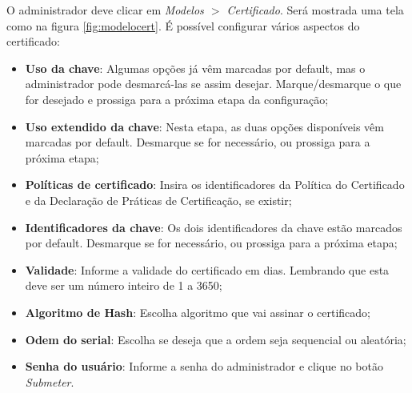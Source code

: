 O administrador deve clicar em \textit{Modelos $>$ Certificado}. Será mostrada uma tela como na figura \ref{fig:modelocert}. É possível configurar vários aspectos do certificado:

\begin{itemize}
	\item \textbf{Uso da chave}: Algumas opções já vêm marcadas por default, mas o administrador pode desmarcá-las se assim desejar. Marque/desmarque o que for desejado e prossiga para a próxima etapa da configuração;
	\item \textbf{Uso extendido da chave}: Nesta etapa, as duas opções disponíveis vêm marcadas por default. Desmarque se for necessário, ou prossiga para a próxima etapa;
	\item \textbf{Políticas de certificado}: Insira os identificadores da Política do Certificado e da Declaração de Práticas de Certificação, se existir;
	\item \textbf{Identificadores da chave}: Os dois identificadores da chave estão marcados por default. Desmarque se for necessário, ou prossiga para a próxima etapa;
	\item \textbf{Validade}: Informe a validade do certificado em dias. Lembrando que esta deve ser um número inteiro de 1 a 3650;
	\item \textbf{Algoritmo de Hash}: Escolha algoritmo que vai assinar o certificado;
	\item \textbf{Odem do serial}: Escolha se deseja que a ordem seja sequencial ou aleatória;
	\item \textbf{Senha do usuário}: Informe a senha do administrador e clique no botão \emph{Submeter}.
\end{itemize}

